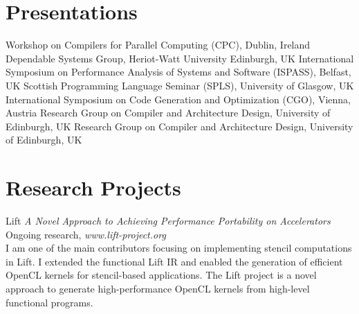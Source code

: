 \documentclass[11pt,a4paper,sans]{moderncv}        %
\begin{document}
\section{Presentations}
					{}{}{}{}
                    {Workshop on Compilers for Parallel Computing (CPC), Dublin, Ireland}
					{}{}{}{}
                    {Dependable Systems Group, Heriot-Watt University Edinburgh, UK}
					{}{}{}{}
                    {International Symposium on Performance Analysis of Systems and Software (ISPASS), Belfast, UK}
					{}{}{}{}
                    {Scottish Programming Language Seminar (SPLS), University of Glasgow, UK}
					{}{}{}{}
                    {International Symposium on Code Generation and Optimization (CGO), Vienna, Austria}
					{}{}{}{}
					{Research Group on Compiler and Architecture Design, University of Edinburgh, UK}
					{}{}{}{}
					{Research Group on Compiler and Architecture Design, University of Edinburgh, UK}


\section{Research Projects}
    \cventry{}
                    {}{}{}{}{}


					{Lift}
					{\textit{A Novel Approach to Achieving Performance Portability on Accelerators}}{}{}
					{Ongoing research, \textit{www.lift-project.org}\\
					 I am one of the main contributors focusing on implementing stencil computations in Lift.
					 I extended the functional Lift IR and enabled the generation
					 of efficient OpenCL kernels for stencil-based applications.
					 The Lift project is a novel approach to generate high-performance OpenCL kernels
					 from high-level functional programs.\\
					}
\end{document}
